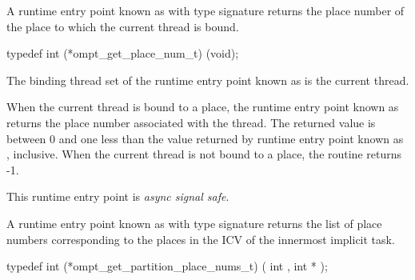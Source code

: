 

\label{sec:ompt_get_place_num_t}
\label{sec:ompt_get_place_num}

\summary

A runtime entry point known as
 with type signature
 returns
the place number of the place to which the current
thread is bound.

\format

\begin{ccppspecific}
\begin{omptInquiry}
typedef int (*ompt_get_place_num_t) (void);
\end{omptInquiry}
\end{ccppspecific}


\binding

The binding thread set
of the runtime entry point known as 
is the current thread.

\descr

When the current thread is bound to a place,
the runtime entry point known as 
returns the place number associated with the thread.
The returned value is between 0 and one less than the value returned
by runtime entry point known as , inclusive.
When the current thread is not bound to a place, the routine returns -1.

This runtime entry point is \emph{async signal safe}.


\label{sec:ompt_get_partition_place_nums_t}
\label{sec:ompt_get_partition_place_nums}

\summary

A runtime entry point known as
 with type signature
returns the list of place numbers corresponding to the places in the 
ICV of the innermost implicit task.

\format

\begin{ccppspecific}
\begin{omptInquiry}
typedef int (*ompt_get_partition_place_nums_t) (
  int ,
  int *
);
\end{omptInquiry}
\end{ccppspecific}


